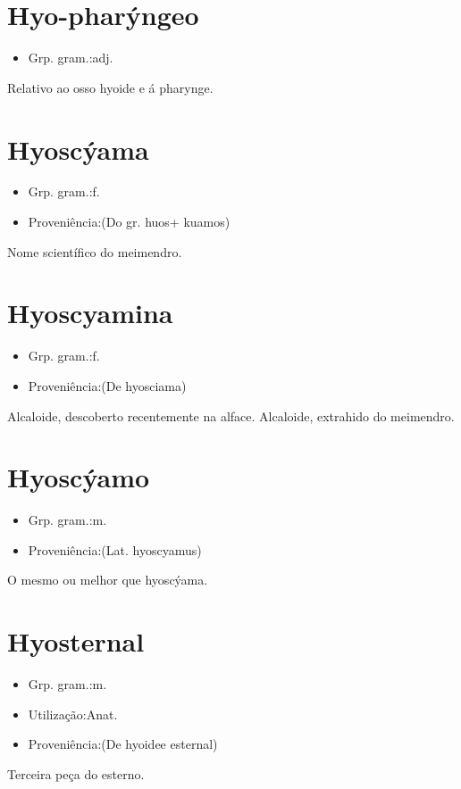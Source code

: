 \documentclass{article}
\begin{document}
\section{Hyo-pharýngeo}
\begin{itemize}
\item {Grp. gram.:adj.}
\end{itemize}
Relativo ao osso hyoide e á pharynge.
\section{Hyoscýama}
\begin{itemize}
\item {Grp. gram.:f.}
\end{itemize}
\begin{itemize}
\item {Proveniência:(Do gr. \textunderscore huos\textunderscore  + \textunderscore kuamos\textunderscore )}
\end{itemize}
Nome scientífico do meimendro.
\section{Hyoscyamina}
\begin{itemize}
\item {Grp. gram.:f.}
\end{itemize}
\begin{itemize}
\item {Proveniência:(De \textunderscore hyosciama\textunderscore )}
\end{itemize}
Alcaloide, descoberto recentemente na alface.
Alcaloide, extrahido do meimendro.
\section{Hyoscýamo}
\begin{itemize}
\item {Grp. gram.:m.}
\end{itemize}
\begin{itemize}
\item {Proveniência:(Lat. \textunderscore hyoscyamus\textunderscore )}
\end{itemize}
O mesmo ou melhor que \textunderscore hyoscýama\textunderscore .
\section{Hyosternal}
\begin{itemize}
\item {Grp. gram.:m.}
\end{itemize}
\begin{itemize}
\item {Utilização:Anat.}
\end{itemize}
\begin{itemize}
\item {Proveniência:(De \textunderscore hyoide\textunderscore  e \textunderscore esternal\textunderscore )}
\end{itemize}
Terceira peça do esterno.
\end{document}

